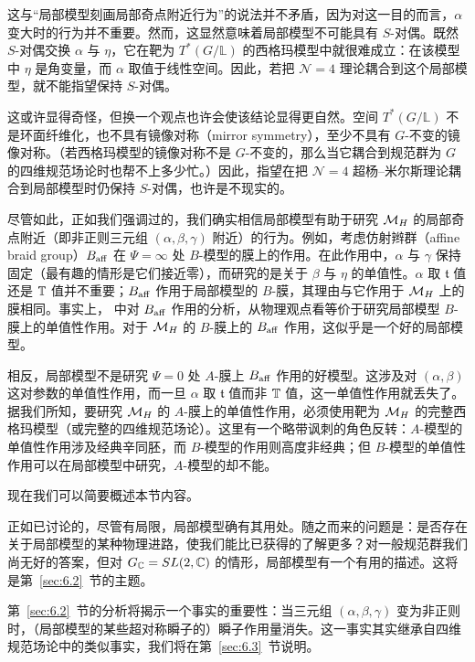 这与“局部模型刻画局部奇点附近行为”的说法并不矛盾，因为对这一目的而言，$\alpha$ 变大时的行为并不重要。然而，这显然意味着局部模型不可能具有 $S$-对偶。既然 $S$-对偶交换 $\alpha$ 与 $\eta$，它在靶为 $T^*(G/\mathbb{L})$ 的西格玛模型中就很难成立：在该模型中 $\eta$ 是角变量，而 $\alpha$ 取值于线性空间。因此，若把 ${\mathcal N}=4$ 理论耦合到这个局部模型，就不能指望保持 $S$-对偶。

这或许显得奇怪，但换一个观点也许会使该结论显得更自然。空间 $T^*(G/\mathbb{L})$ 不是环面纤维化，也不具有镜像对称（mirror symmetry），至少不具有 $G$-不变的镜像对称。（若西格玛模型的镜像对称不是 $G$-不变的，那么当它耦合到规范群为 $G$ 的四维规范场论时也帮不上多少忙。）因此，指望在把 ${\mathcal N}=4$ 超杨–米尔斯理论耦合到局部模型时仍保持 $S$-对偶，也许是不现实的。

尽管如此，正如我们强调过的，我们确实相信局部模型有助于研究 ${{\mathcal{M}}_H}$ 的局部奇点附近（即非正则三元组 $(\alpha,\beta,\gamma)$ 附近）的行为。例如，考虑仿射辫群（affine braid group）${B_{\rm aff}}$ 在 $\Psi=\infty$ 处 $B$-模型的膜上的作用。在此作用中，$\alpha$ 与 $\gamma$ 保持固定（最有趣的情形是它们接近零），而研究的是关于 $\beta$ 与 $\eta$ 的单值性。$\alpha$ 取 $\mathfrak t$ 值还是 ${\mathbb{T}}$ 值并不重要；${B_{\rm aff}}$ 作用于局部模型的 $B$-膜，其理由与它作用于 ${{\mathcal{M}}_H}$ 上的膜相同。事实上，\cite{ref29} 中对 ${B_{\rm aff}}$ 作用的分析，从物理观点看等价于研究局部模型 $B$-膜上的单值性作用。对于 ${{\mathcal{M}}_H}$ 的 $B$-膜上的 ${B_{\rm aff}}$ 作用，这似乎是一个好的局部模型。

相反，局部模型不是研究 $\Psi=0$ 处 $A$-膜上 ${B_{\rm aff}}$ 作用的好模型。这涉及对 $(\alpha,\beta)$ 这对参数的单值性作用，而一旦 $\alpha$ 取 $\mathfrak t$ 值而非 ${\mathbb{T}}$ 值，这一单值性作用就丢失了。据我们所知，要研究 ${{\mathcal{M}}_H}$ 的 $A$-膜上的单值性作用，必须使用靶为 ${{\mathcal{M}}_H}$ 的完整西格玛模型（或完整的四维规范场论）。这里有一个略带讽刺的角色反转：$A$-模型的单值性作用涉及经典辛同胚，而 $B$-模型的作用则高度非经典；但 $B$-模型的单值性作用可以在局部模型中研究，$A$-模型的却不能。

\bigskip{}

现在我们可以简要概述本节内容。

正如已讨论的，尽管有局限，局部模型确有其用处。随之而来的问题是：是否存在关于局部模型的某种物理进路，使我们能比已获得的了解更多？对一般规范群我们尚无好的答案，但对 $G_{\mathbb{C}}=SL(2,{\mathbb{C}})$ 的情形，局部模型有一个有用的描述。这将是第~\ref{sec:6.2}~节的主题。

第~\ref{sec:6.2}~节的分析将揭示一个事实的重要性：当三元组 $(\alpha,\beta,\gamma)$ 变为非正则时，（局部模型的某些超对称瞬子的）瞬子作用量消失。这一事实其实继承自四维规范场论中的类似事实，我们将在第~\ref{sec:6.3}~节说明。

